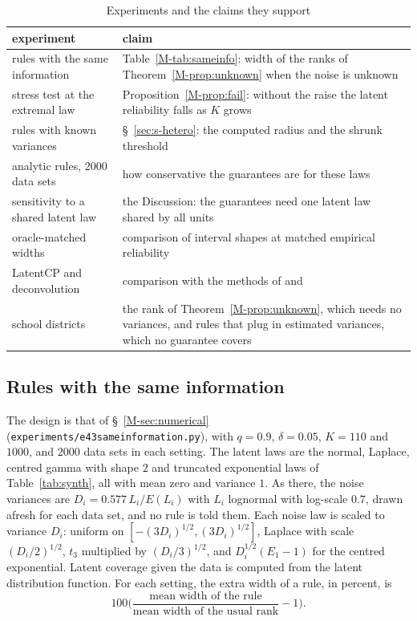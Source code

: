 \documentclass[11pt]{article}
\renewcommand{\_}{\usc\allowbreak}
\begin{document}
\begin{table}[h]
\centering
\caption{Experiments and the claims they support}
\label{tab:s-sims}
\footnotesize
\begin{tabular}{>{\raggedright\arraybackslash}p{}>{\raggedright\arraybackslash}p{}}
\toprule
experiment & claim \\
\midrule
rules with the same information & Table~\ref{M-tab:sameinfo}: width of the ranks of Theorem~\ref{M-prop:unknown} when the noise is unknown \\
stress test at the extremal law & Proposition~\ref{M-prop:fail}: without the raise the latent reliability falls as $K$ grows \\
rules with known variances & \S~\ref{sec:s-hetero}: the computed radius and the shrunk threshold \\
analytic rules, $2000$ data sets & how conservative the guarantees are for these laws \\
sensitivity to a shared latent law & the Discussion: the guarantees need one latent law shared by all units \\
oracle-matched widths & comparison of interval shapes at matched empirical reliability \\
LatentCP and deconvolution & comparison with the methods of \citet{zheng2026} and \citet{cohen2025} \\
school districts & the rank of Theorem~\ref{M-prop:unknown}, which needs no variances, and rules that plug in estimated variances, which no guarantee covers \\
\bottomrule
\end{tabular}
\end{table}

\subsection*{Rules with the same information}

The design is that of \S~\ref{M-sec:numerical} (\texttt{experiments/e43\_same\_information.py}), with $q = 0.9$, $\delta = 0.05$, $K = 110$ and $1000$, and $2000$ data sets in each setting. The latent laws are the normal, Laplace, centred gamma with shape $2$ and truncated exponential laws of Table~\ref{tab:synth}, all with mean zero and variance $1$. As there, the noise variances are $D_i = 0.577\,L_i/E(L_i)$ with $L_i$ lognormal with log-scale $0.7$, drawn afresh for each data set, and no rule is told them. Each noise law is scaled to variance $D_i$: uniform on $[-(3D_i)^{1/2}, (3D_i)^{1/2}]$, Laplace with scale $(D_i/2)^{1/2}$, $t_3$ multiplied by $(D_i/3)^{1/2}$, and $D_i^{1/2}(E_1 - 1)$ for the centred exponential. Latent coverage given the data is computed from the latent distribution function. For each setting, the extra width of a rule, in percent, is
\[
100\Big(\frac{\text{mean width of the rule}}{\text{mean width of the usual rank}} - 1\Big).
\]
\end{document}
